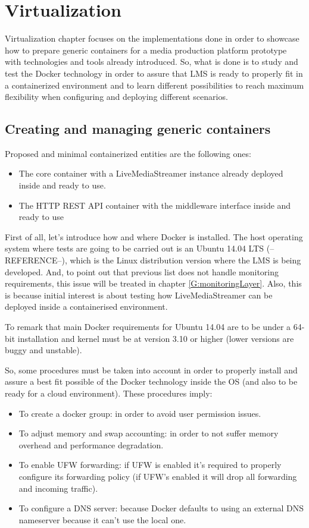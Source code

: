 \chapter{Virtualization}\label{D:virtualization}

Virtualization chapter focuses on the implementations done in order to showcase how to prepare generic containers for a media production platform prototype with technologies and tools already introduced. So, what is done is to study and test the Docker technology in order to assure that LMS is ready to properly fit in a containerized environment and to learn different possibilities to reach maximum flexibility when configuring and deploying different scenarios.

\section{Creating and managing generic containers}
Proposed and minimal containerized entities are the following ones:

\begin{itemize}
\item The core container with a LiveMediaStreamer instance already deployed inside and ready to use.
\item The HTTP REST API container with the middleware interface inside and ready to use
\end{itemize}

First of all, let's introduce how and where Docker is installed. The host operating system where tests are going to be carried out is an Ubuntu 14.04 LTS (--REFERENCE--), which is the Linux distribution version where the LMS is being developed. And, to point out that previous list does not handle monitoring requirements, this issue will be treated in chapter \ref{G:monitoringLayer}. Also, this is because initial interest is about testing how LiveMediaStreamer can be deployed inside a containerised environment.

To remark that main Docker requirements for Ubuntu 14.04 are to be under a 64-bit installation and kernel must be at version 3.10 or higher (lower versions are buggy and unstable). 

So, some procedures must be taken into account in order to properly install and assure a best fit possible of the Docker technology inside the OS (and also to be ready for a cloud environment). These procedures imply:

\begin{itemize}
\item To create a docker group: in order to avoid user permission issues.
\item To adjust memory and swap accounting: in order to not suffer memory overhead and performance degradation.
\item To enable UFW forwarding: if UFW is enabled it's required to properly configure its forwarding policy (if UFW's enabled it will drop all forwarding and incoming traffic).
\item To configure a DNS server: because Docker defaults to using an external DNS nameserver because it can't use the local one.
\end{itemize}

